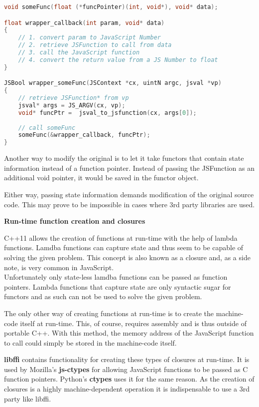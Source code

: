 \SingleSpacing
\begin{lstlisting}[language=C++, caption=Wrapper code for handling methods that take function pointers \#2]
void someFunc(float (*funcPointer)(int, void*), void* data);

float wrapper_callback(int param, void* data)
{
	// 1. convert param to JavaScript Number
	// 2. retrieve JSFunction to call from data
	// 3. call the JavaScript function
	// 4. convert the return value from a JS Number to float
}

JSBool wrapper_someFunc(JSContext *cx, uintN argc, jsval *vp)
{
	// retrieve JSFunction* from vp
	jsval* args = JS_ARGV(cx, vp);
	void* funcPtr =  jsval_to_jsfunction(cx, args[0]);
	
	// call someFunc
	someFunc(&wrapper_callback, funcPtr);
}
\end{lstlisting}
\OnehalfSpacing

Another way to modify the original  is to let it take functors that contain state information instead of a function pointer. Instead of passing the JSFunction as an additional void pointer, it would be saved in the functor object.

Either way, passing state information demands modification of the original source code. This may prove to be impossible in cases where 3rd party libraries are used.

\textbf{Run-time function creation and closures}

C++11 allows the creation of functions at run-time with the help of lambda functions. Lamdba functions can capture state and thus seem to be capable of solving the given problem. This concept is also known as a closure and, as a side note, is very common in JavaScript.
\\Unfortunately only state-less lamdba functions can be passed as function pointers. Lambda functions that capture state are only syntactic sugar for functors and as such can not be used to solve the given problem.

The only other way of creating functions at run-time is to create the machine-code itself at run-time. This, of course, requires assembly and is thus outside of portable C++. With this method, the memory address of the JavaScript function to call could simply be stored in the machine-code itself.

\textbf{libffi} contains functionality for creating these types of closures at run-time. It is used by Mozilla's \textbf{js-ctypes} for allowing JavaScript functions to be passed as C function pointers. Python's \textbf{ctypes} uses it for the same reason. As the creation of closures is a highly machine-dependent operation it is indispensable to use a 3rd party like libffi.

